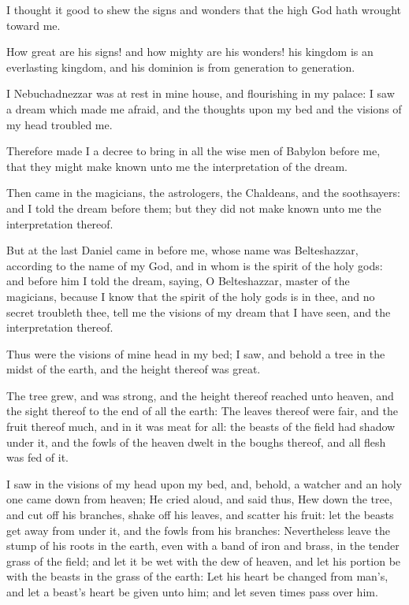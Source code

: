 \verse I thought it good to shew the signs and wonders that the high God hath wrought toward me.

\verse How great are his signs! and how mighty are his wonders! his kingdom is an everlasting kingdom, and his dominion is from generation to generation.

\verse I Nebuchadnezzar was at rest in mine house, and flourishing in my palace: \verse I saw a dream which made me afraid, and the thoughts upon my bed and the visions of my head troubled me.

\verse Therefore made I a decree to bring in all the wise men of Babylon before me, that they might make known unto me the interpretation of the dream.

\verse Then came in the magicians, the astrologers, the Chaldeans, and the soothsayers: and I told the dream before them; but they did not make known unto me the interpretation thereof.

\verse But at the last Daniel came in before me, whose name was Belteshazzar, according to the name of my God, and in whom is the spirit of the holy gods: and before him I told the dream, saying, \verse O Belteshazzar, master of the magicians, because I know that the spirit of the holy gods is in thee, and no secret troubleth thee, tell me the visions of my dream that I have seen, and the interpretation thereof.

\verse Thus were the visions of mine head in my bed; I saw, and behold a tree in the midst of the earth, and the height thereof was great.

\verse The tree grew, and was strong, and the height thereof reached unto heaven, and the sight thereof to the end of all the earth: \verse The leaves thereof were fair, and the fruit thereof much, and in it was meat for all: the beasts of the field had shadow under it, and the fowls of the heaven dwelt in the boughs thereof, and all flesh was fed of it.

\verse I saw in the visions of my head upon my bed, and, behold, a watcher and an holy one came down from heaven; \verse He cried aloud, and said thus, Hew down the tree, and cut off his branches, shake off his leaves, and scatter his fruit: let the beasts get away from under it, and the fowls from his branches: \verse Nevertheless leave the stump of his roots in the earth, even with a band of iron and brass, in the tender grass of the field; and let it be wet with the dew of heaven, and let his portion be with the beasts in the grass of the earth: \verse Let his heart be changed from man's, and let a beast's heart be given unto him; and let seven times pass over him.

